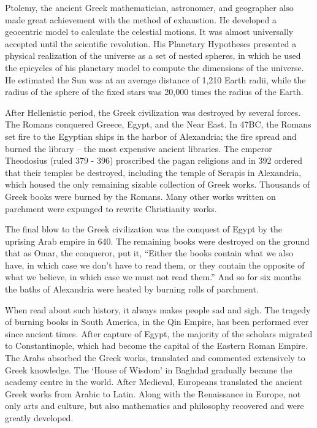 \documentclass{article}
\begin{document}
Ptolemy, the ancient Greek mathematician, astronomer, and geographer also made great achievement with the method of exhaustion. He developed a geocentric model to calculate the celestial motions. It was almost universally accepted until the scientific revolution. His Planetary Hypotheses presented a physical realization of the universe as a set of nested spheres, in which he used the epicycles of his planetary model to compute the dimensions of the universe. He estimated the Sun was at an average distance of 1,210 Earth radii, while the radius of the sphere of the fixed stars was 20,000 times the radius of the Earth.

After Hellenistic period, the Greek civilization was destroyed by several forces. The Romans conquered Greece, Egypt, and the Near East. In 47BC, the Romans set fire to the Egyptian ships in the harbor of Alexandria; the fire spread and burned the library -- the most expensive ancient libraries. The emperor Theodosius (ruled 379 - 396) proscribed the pagan religions and in 392 ordered that their temples be destroyed, including the temple of Serapis in Alexandria, which housed the only remaining sizable collection of Greek works. Thousands of Greek books were burned by the Romans. Many other works written on parchment were expunged to rewrite Christianity works.

The final blow to the Greek civilization was the conquest of Egypt by the uprising Arab empire in 640. The remaining books were destroyed on the ground that as Omar, the conqueror, put it, ``Either the books contain what we also have, in which case we don't have to read them, or they contain the opposite of what we believe, in which case we must not read them.'' And so for six months the baths of Alexandria were heated by burning rolls of parchment\cite{M-Kline-2007}.

When read about such history, it always makes people sad and sigh. The tragedy of burning books in South America, in the Qin Empire, has been performed ever since ancient times. After capture of Egypt, the majority of the scholars migrated to Constantinople, which had become the capital of the Eastern Roman Empire. The Arabs absorbed the Greek works, translated and commented extensively to Greek knowledge. The `House of Wisdom' in Baghdad gradually became the academy centre in the world. After Medieval, Europeans translated the ancient Greek works from Arabic to Latin. Along with the Renaissance in Europe, not only arts and culture, but also mathematics and philosophy recovered and were greatly developed.
\end{document}
